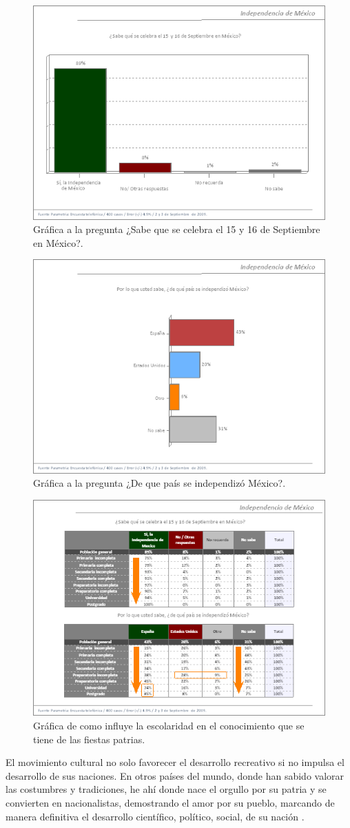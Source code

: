 \begin{figure}
	\centering 
	\includegraphics[width=.50\textwidth]{03MarcoTeorico/imageR/enc01}
	\caption{Gráfica a la pregunta ¿Sabe que se celebra el 15 y 16 de Septiembre en México?.}
	\label{fig:enc01}
\end{figure}

\begin{figure}
	\centering 
	\includegraphics[width=.5\textwidth]{03MarcoTeorico/imageR/enc02}
	\caption{Gráfica a la pregunta ¿De que país se independizó México?.}
	\label{fig:enc02}
\end{figure}

\begin{figure}
	\centering 
	\includegraphics[width=.5\textwidth]{03MarcoTeorico/imageR/enc03}
	\caption{Gráfica de como influye la escolaridad en el conocimiento que se tiene de las fiestas patrias.}
	\label{fig:enc03}
\end{figure}


El movimiento cultural no solo favorecer el desarrollo recreativo si no impulsa el desarrollo de sus naciones.
En otros países del mundo, donde han sabido valorar las costumbres y tradiciones, he ahí donde nace el orgullo por su patria y se convierten en nacionalistas, demostrando el amor por su pueblo, marcando de manera definitiva el desarrollo científico, político, social, de su nación \cite{pp06}.
\\[1pt]

